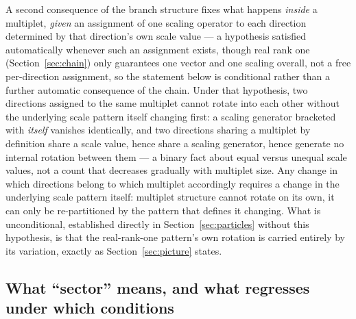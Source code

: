 \documentclass[pdflatex,sn-mathphys-num]{sn-jnl}
\theoremstyle{thmstyleone}
\theoremstyle{thmstylethree}
\theoremstyle{thmstyletwo}
\begin{document}
A second consequence of the branch structure fixes what happens
\emph{inside} a multiplet, \emph{given} an assignment of one scaling
operator to each direction determined by that direction's own scale
value — a hypothesis satisfied automatically whenever such an
assignment exists, though real rank one (Section~\ref{sec:chain}) only
guarantees one vector and one scaling overall, not a free per-direction
assignment, so the statement below is conditional rather than a further
automatic consequence of the chain. Under that hypothesis, two
directions assigned to the same multiplet cannot rotate into each other
without the underlying scale pattern itself changing first: a scaling
generator bracketed with \emph{itself} vanishes identically, and two
directions sharing a multiplet by definition share a scale value, hence
share a scaling generator, hence generate no internal rotation between
them — a binary fact about equal versus unequal scale values, not a
count that decreases gradually with multiplet size. Any change in which
directions belong to which multiplet accordingly requires a change in
the underlying scale pattern itself: multiplet structure cannot rotate
on its own, it can only be re-partitioned by the pattern that defines it
changing. What is unconditional, established directly in
Section~\ref{sec:particles} without this hypothesis, is that the
real-rank-one pattern's own rotation is carried entirely by its
variation, exactly as Section~\ref{sec:picture} states.

\subsection{What ``sector'' means, and what regresses under which conditions}\label{ss:sectors}
\end{document}
